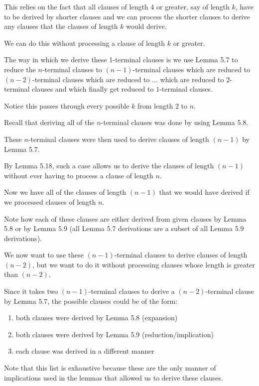 \documentclass[manuscript]{acmart}
\begin{document}
    This relies on the fact that all clauses of length 4 or greater, say of length $k$, have to be derived by shorter clauses and we can process the shorter clauses to derive any clauses that the clauses of length $k$ would derive.

    We can do this without processing a clause of length $k$ or greater.

    The way in which we derive these 1-terminal clauses is we use Lemma 5.7 to reduce the $n$-terminal clauses to $(n-1)$-terminal clauses which are reduced to $(n-2)$-terminal clauses which are reduced to ... which are reduced to $2$-terminal clauses and which finally get reduced to $1$-terminal clauses.

    Notice this passes through every possible $k$ from length $2$ to $n$.

    Recall that deriving all of the $n$-terminal clauses was done by using Lemma 5.8.

    These $n$-terminal clauses were then used to derive clauses of length $(n - 1)$ by Lemma 5.7.

    By Lemma 5.18, such a case allows us to derive the clauses of length $(n - 1)$ without ever having to process a clause of length $n$.

    Now we have all of the clauses of length $(n - 1)$ that we would have derived if we processed clauses of length $n$.

    Note how each of these clauses are either derived from given clauses by Lemma 5.8 or by Lemma 5.9 (all Lemma 5.7 derivations are a subset of all Lemma 5.9 derivations).

    We now want to use these $(n-1)$-terminal clauses to derive clauses of length $(n-2)$, but we want to do it without processing clauses whose length is greater than $(n-2)$.

    Since it takes two $(n-1)$-terminal clauses to derive a $(n-2)$-terminal clause by Lemma 5.7, the possible clauses could be of the form:

    \begin{enumerate}
        \item both clauses were derived by Lemma 5.8 (expansion)
        \item both clauses were derived by Lemma 5.9 (reduction/implication)
        \item each clause was derived in a different manner
    \end{enumerate}

    Note that this list is exhaustive because these are the only manner of implications used in the lemmas that allowed us to derive these clauses.
\end{document}
